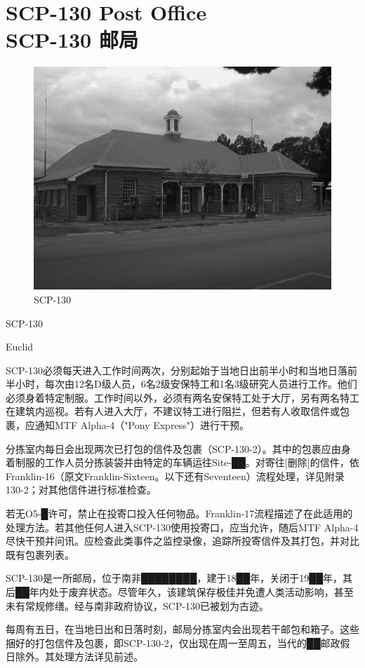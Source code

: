 \chapter[SCP-130 邮局]{
    SCP-130 Post Office\\
    SCP-130 邮局
}

\label{chap:SCP-130}

\begin{figure}[H]
    \centering
    \includegraphics[width=0.5\linewidth]{images/SCP.130.jpg}
    \caption*{SCP-130}
\end{figure}

SCP-130

Euclid

SCP-130必须每天进入工作时间两次，分别起始于当地日出前半小时和当地日落前半小时，每次由12名D级人员，6名2级安保特工和1名3级研究人员进行工作。他们必须身着特定制服。工作时间以外，必须有两名安保特工处于大厅，另有两名特工在建筑内巡视。若有人进入大厅，不建议特工进行阻拦，但若有人收取信件或包裹，应通知MTF Alpha-4（"Pony Express"）进行干预。

分拣室内每日会出现两次已打包的信件及包裹（SCP-130-2）。其中的包裹应由身着制服的工作人员分拣装袋并由特定的车辆运往Site-██。对寄往{[}删除]的信件，依Franklin-16（原文Franklin-Sixteen。以下还有Seventeen）流程处理，详见附录130-2；对其他信件进行标准检查。

若无O5-█许可，禁止在投寄口投入任何物品。Franklin-17流程描述了在此适用的处理方法。若其他任何人进入SCP-130使用投寄口，应当允许，随后MTF Alpha-4尽快干预并问讯。应检查此类事件之监控录像，追踪所投寄信件及其打包，并对比既有包裹列表。

SCP-130是一所邮局，位于南非████████，建于18██年，关闭于19██年，其后██年内处于废弃状态。尽管年久，该建筑保存极佳并免遭人类活动影响，甚至未有常规修缮。经与南非政府协议，SCP-130已被划为古迹。

每周有五日，在当地日出和日落时刻，邮局分拣室内会出现若干邮包和箱子。这些捆好的打包信件及包裹，即SCP-130-2，仅出现在周一至周五，当代的██邮政假日除外。其处理方法详见前述。

